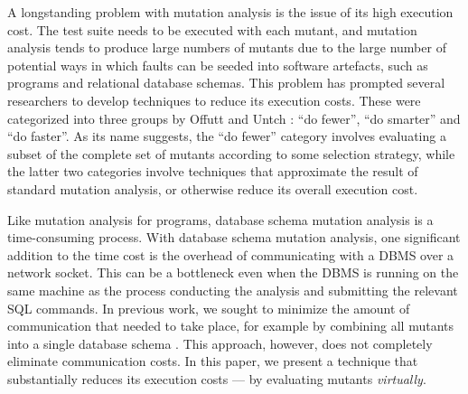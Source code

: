 A longstanding problem with mutation analysis is the issue of its high execution cost. The test suite needs to be executed with each mutant, and mutation analysis tends to produce large numbers of mutants due to the large number of potential ways in which faults can be seeded into software artefacts, such as programs and relational database schemas. This
problem
has prompted several researchers to develop techniques to reduce its execution costs. These were categorized into three groups by Offutt and Untch \cite{Offutt2001}: ``do fewer'', ``do smarter'' and ``do faster''. As its name suggests, the ``do fewer'' category involves evaluating a subset of the complete set of mutants according to some selection strategy, while the latter two categories involve techniques that approximate the result of standard mutation analysis, or otherwise reduce its overall execution cost.

Like mutation analysis for programs, database schema mutation analysis is a time-consuming process. With database schema mutation analysis, one significant addition to the time cost is the overhead of communicating with a DBMS over a network socket. This can be a bottleneck even when the DBMS is running on the same machine as the process conducting the analysis and submitting the relevant SQL commands. In previous work, we sought to minimize the amount of communication that needed to take place, for example by combining all mutants into a single database schema \cite{Wright2013}. This approach, however, does not completely eliminate communication costs. In this paper, we present a technique that substantially reduces its execution costs --- by evaluating mutants {\it virtually}.


